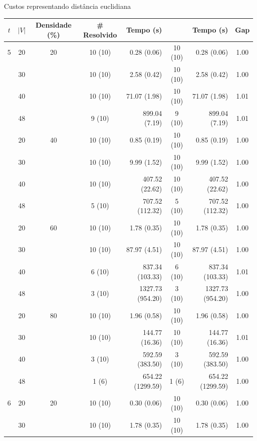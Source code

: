 \documentclass[dvipsnames]{beamer}
\newcommand\Fontvi{\fontsize{5}{6.2}\selectfont}
\begin{document}
\begin{frame}{Custos representando distância euclidiana}
  \tiny{
    \Fontvi
\begin{table}
\begin{tabular}{|c|c|c|>{\columncolor[rgb]{1,1,0}}c|r|>{\columncolor[rgb]{1,1,0}}c|r|c|}\hline

{$t$} & {$|V|$} & {Densidade (\%)} & {\# Resolvido } & {Tempo (s)}  &{\# Árvore}  &{Tempo (s)} & {Gap}
\\ \hline\hline

5 & 20 & 20 & 10 (10) & 0.28 (0.06) & 10 (10) & 0.28 (0.06) & 1.00 \\
 & 30 & & 10 (10) & 2.58 (0.42) & 10 (10) & 2.58 (0.42) & 1.00 \\
 & 40 & & 10 (10) & 71.07 (1.98) & 10 (10) & 71.07 (1.98) & 1.01 \\
 & 48 & & 9 (10) & 899.04 (7.19) & 9 (10) & 899.04 (7.19) & 1.01 \\
 & 20 & 40 & 10 (10) & 0.85 (0.19) & 10 (10) & 0.85 (0.19) & 1.00 \\
 & 30 & & 10 (10) & 9.99 (1.52) & 10 (10) & 9.99 (1.52) & 1.00 \\
 & 40 & & 10 (10) & 407.52 (22.62) & 10 (10) & 407.52 (22.62) & 1.00 \\
 & 48 & & 5 (10) & 707.52 (112.32) & 5 (10) & 707.52 (112.32) & 1.00 \\
 & 20 & 60 & 10 (10) & 1.78 (0.35) & 10 (10) & 1.78 (0.35) & 1.00 \\
 & 30 & & 10 (10) & 87.97 (4.51) & 10 (10) & 87.97 (4.51) & 1.00 \\
 & 40 & & 6 (10) & 837.34 (103.33) & 6 (10) & 837.34 (103.33) & 1.01 \\
 & 48 & & 3 (10) & 1327.73 (954.20) & 3 (10) & 1327.73 (954.20) & 1.00 \\
 & 20 & 80 & 10 (10) & 1.96 (0.58) & 10 (10) & 1.96 (0.58) & 1.00 \\
 & 30 & & 10 (10) & 144.77 (16.36) & 10 (10) & 144.77 (16.36) & 1.01 \\
 & 40 & & 3 (10) & 592.59 (383.50) & 3 (10) & 592.59 (383.50) & 1.00 \\
\rowcolor[rgb]{1,1,0} & 48 & & 1 (6) & 654.22 (1299.59) & 1 (6) & 654.22 (1299.59) & 1.00 \\
6 & 20 & 20 & 10 (10) & 0.30 (0.06) & 10 (10) & 0.30 (0.06) & 1.00 \\
 & 30 & & 10 (10) & 1.78 (0.35) & 10 (10) & 1.78 (0.35) & 1.00 \\

\end{tabular}
\end{table}}
\end{frame}
\end{document}
